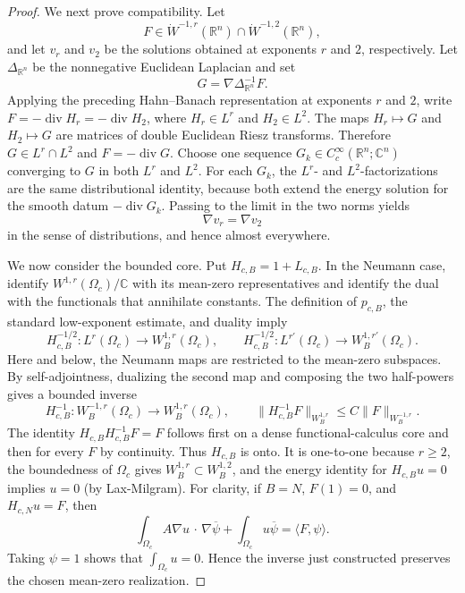\documentclass[12pt]{amsart}
\newcommand{\cdo}{\, \cdot \,}
\newcommand{\diver}{\operatorname{div}}
\theoremstyle{remark}
\begin{document}
\begin{proof}
We next prove compatibility.  Let
\[
 F\in\dot W^{-1,r}(\mathbb R^n)
       \cap\dot W^{-1,2}(\mathbb R^n),
\]
and let \(v_r\) and \(v_2\) be the solutions obtained at exponents \(r\)
and \(2\), respectively.  Let \(\Delta_{\mathbb R^n}\) be the nonnegative
Euclidean Laplacian and set
\[
 G=\nabla\Delta_{\mathbb R^n}^{-1}F.
\]
Applying the preceding Hahn--Banach representation at exponents \(r\)
and \(2\), write \(F=-\diver H_r=-\diver H_2\), where
\(H_r\in L^r\) and \(H_2\in L^2\).  The maps
\(H_r\mapsto G\) and \(H_2\mapsto G\) are matrices of double Euclidean
Riesz transforms.  Therefore \(G\in L^r\cap L^2\) and
\(F=-\diver G\). Choose one sequence \(G_k\in C_c^\infty(\mathbb R^n;\mathbb C^n)\)
converging to \(G\) in both \(L^r\) and \(L^2\).  For each \(G_k\), the
\(L^r\)- and \(L^2\)-factorizations are the same distributional identity,
because both extend the energy solution for the smooth datum
\(-\diver G_k\).  Passing to the limit in the two norms yields
\[
 \nabla v_r=\nabla v_2
\]
in the sense of distributions, and hence almost everywhere.

We now consider the bounded core.  Put \(H_{c,B}=1+L_{c,B}\).  In the
Neumann case, identify \(W^{1,r}(\Omega_c)/\mathbb C\) with its mean-zero
representatives and identify the dual with the functionals that annihilate
constants.  The definition of \(p_{c,B}\), the standard low-exponent
estimate, and duality imply
\[
 H_{c,B}^{-1/2}:L^r(\Omega_c)\longrightarrow W_B^{1,r}(\Omega_c),
 \qquad
 H_{c,B}^{-1/2}:L^{r'}(\Omega_c)\longrightarrow W_B^{1,r'}(\Omega_c).
\]
Here and below, the Neumann maps are restricted to the mean-zero
subspaces.  By self-adjointness, dualizing the second map and
composing the two half-powers gives a bounded inverse
\[
 H_{c,B}^{-1}:W_B^{-1,r}(\Omega_c)\longrightarrow W_B^{1,r}(\Omega_c),
 \qquad
 \|H_{c,B}^{-1}F\|_{W_B^{1,r}}\leq C\|F\|_{W_B^{-1,r}}.
\]
The identity \(H_{c,B}H_{c,B}^{-1}F=F\) follows first on a dense
functional-calculus core and then for every \(F\) by continuity.  Thus
\(H_{c,B}\) is onto.  It is one-to-one because \(r\geq2\), the boundedness
of \(\Omega_c\) gives \(W_B^{1,r}\subset W_B^{1,2}\), and the energy
identity for \(H_{c,B}u=0\) implies \(u=0\) (by Lax-Milgram). For clarity, if \(B=N\), \(F(1)=0\), and \(H_{c,N}u=F\), then
\begin{equation}\label{eq:core-shifted-weak}
 \int_{\Omega_c}A\nabla u\mathbin{\cdo}\nabla\overline\psi
 +\int_{\Omega_c}u\overline\psi
 =\langle F,\psi\rangle.
\end{equation}
Taking \(\psi=1\) shows that \(\int_{\Omega_c}u=0\).  Hence the inverse
just constructed preserves the chosen mean-zero realization.


\end{proof}
\end{document}

